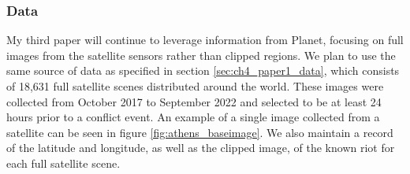 \subsubsection{Data}
My third paper will continue to leverage information from Planet, focusing on full images from the satellite sensors rather than clipped regions.  We plan to use the same source of data as specified in section \ref{sec:ch4_paper1_data}, which consists of 18,631 full satellite scenes distributed around the world. These images were collected from October 2017 to September 2022 and selected to be at least 24 hours prior to a conflict event.  An example of a single image collected from a satellite can be seen in figure \ref{fig:athens_baseimage}. 
 We also maintain a record of the latitude and longitude, as well as the clipped image, of the known riot for each full satellite scene.


